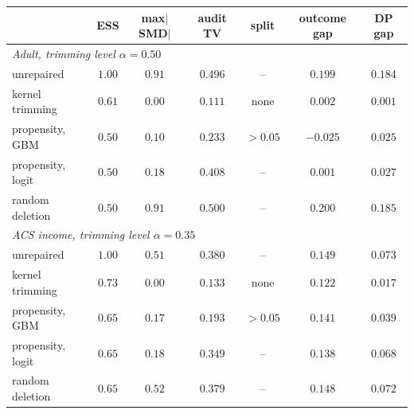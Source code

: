 \begin{tabular}{lcccccc}
\toprule
& ESS & max$|$SMD$|$ & audit TV & split & outcome gap & DP gap \\
\midrule
\multicolumn{7}{l}{\emph{Adult, trimming level $\alpha=0.50$}} \\
\quad unrepaired & $1.00$ & $0.91$ & $0.496$ & -- & $0.199$ & $0.184$ \\
\quad kernel trimming & $0.61$ & $0.00$ & $0.111$ & none & $0.002$ & $0.001$ \\
\quad propensity, GBM & $0.50$ & $0.10$ & $0.233$ & $>0.05$ & $-0.025$ & $0.025$ \\
\quad propensity, logit & $0.50$ & $0.18$ & $0.408$ & -- & $0.001$ & $0.027$ \\
\quad random deletion & $0.50$ & $0.91$ & $0.500$ & -- & $0.200$ & $0.185$ \\
\multicolumn{7}{l}{\emph{ACS income, trimming level $\alpha=0.35$}} \\
\quad unrepaired & $1.00$ & $0.51$ & $0.380$ & -- & $0.149$ & $0.073$ \\
\quad kernel trimming & $0.73$ & $0.00$ & $0.133$ & none & $0.122$ & $0.017$ \\
\quad propensity, GBM & $0.65$ & $0.17$ & $0.193$ & $>0.05$ & $0.141$ & $0.039$ \\
\quad propensity, logit & $0.65$ & $0.18$ & $0.349$ & -- & $0.138$ & $0.068$ \\
\quad random deletion & $0.65$ & $0.52$ & $0.379$ & -- & $0.148$ & $0.072$ \\
\bottomrule
\end{tabular}
